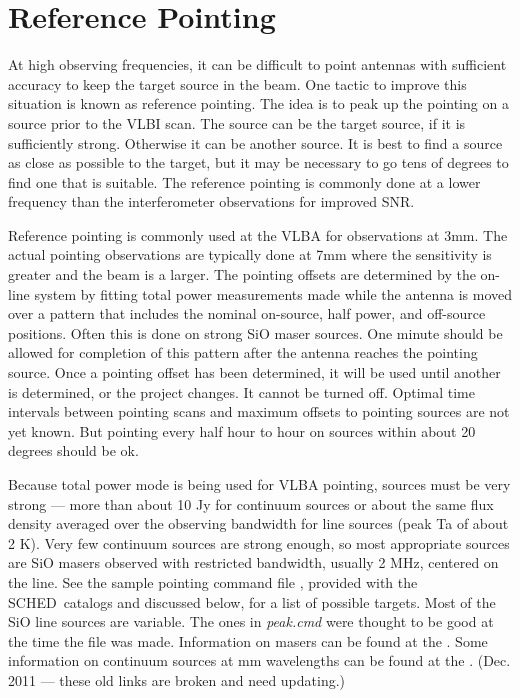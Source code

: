 \documentclass{report}
\newcommand{\schedb}{{\sc SCHED~}}
\begin{document}
\section{\label{SEC:REFPOINT}Reference Pointing}

At high observing frequencies, it can be difficult to point antennas with
sufficient accuracy to keep the target source in the beam.  One tactic to
improve this situation is known as reference pointing.  The idea is to
peak up the pointing on a source prior to the VLBI scan.  The source can
be the target source, if it is sufficiently strong.  Otherwise it can
be another source.  It is best to find a source as close as possible
to the target, but it may be necessary to go tens of degrees to find
one that is suitable.  The reference pointing is commonly done at a
lower frequency than the interferometer observations for improved SNR.

Reference pointing is commonly used at the VLBA for observations at
3mm.  The actual pointing observations are typically done at 7mm where
the sensitivity is greater and the beam is a larger.  The pointing
offsets are determined by the on-line system by fitting total power
measurements made while the antenna is moved over a pattern that
includes the nominal on-source, half power, and off-source positions.
Often this is done on strong SiO maser sources.  One minute should be
allowed for completion of this pattern after the antenna reaches the
pointing source.  Once a pointing offset has been determined, it will
be used until another is determined, or the project changes.  It
cannot be turned off.  Optimal time intervals between pointing scans
and maximum offsets to pointing sources are not yet known.  But
pointing every half hour to hour on sources within about 20 degrees
should be ok.

Because total power mode is being used for VLBA pointing, sources must
be very strong --- more than about 10 Jy for continuum sources or
about the same flux density averaged over the observing bandwidth for
line sources (peak Ta of about 2 K).  Very few continuum sources are
strong enough, so most appropriate sources are SiO masers observed
with restricted bandwidth, usually 2 MHz, centered on the line.  See
the sample pointing command file , provided with the
\schedb catalogs and discussed below, for a list of possible targets.
Most of the SiO line sources are variable.  The ones in {\sl peak.cmd}
were thought to be good at the time the file was made.  Information on
masers can be found at the .
Some information on continuum sources at mm wavelengths can be found
at the
.
(Dec. 2011 --- these old links are broken and need updating.)
\end{document}
